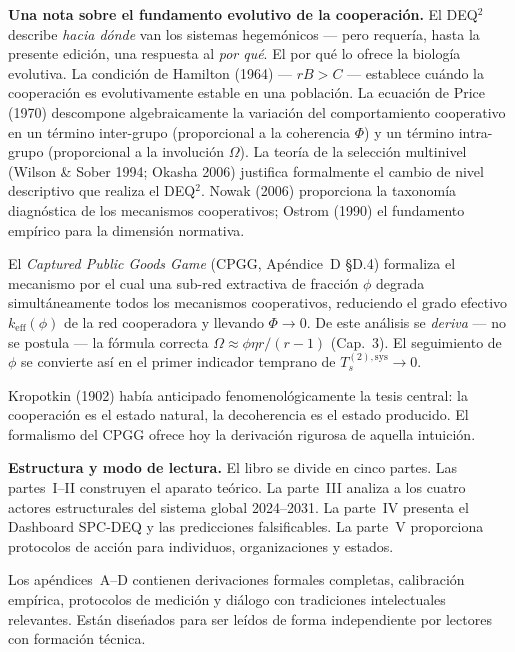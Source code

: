 \documentclass[12pt, twoside]{book}
\theoremstyle{plain}
\theoremstyle{definition}
\theoremstyle{remark}
\begin{document}
\textbf{Una nota sobre el fundamento evolutivo de la cooperaci\'{o}n.}
El DEQ$^2$ describe \textit{hacia d\'{o}nde} van los sistemas hegem\'{o}nicos --- pero requería, hasta la presente edici\'{o}n, una respuesta al \textit{por qu\'{e}}. El por qu\'{e} lo ofrece la biolog\'{i}a evolutiva. La condici\'{o}n de Hamilton (1964) --- $rB > C$ --- establece cu\'{a}ndo la cooperaci\'{o}n es evolutivamente estable en una poblaci\'{o}n. La ecuaci\'{o}n de Price (1970) descompone algebraicamente la variaci\'{o}n del comportamiento cooperativo en un t\'{e}rmino inter-grupo (proporcional a la coherencia $\Phi$) y un t\'{e}rmino intra-grupo (proporcional a la involuci\'{o}n $\Omega$). La teor\'{i}a de la selecci\'{o}n multinivel (Wilson \& Sober 1994; Okasha 2006) justifica formalmente el cambio de nivel descriptivo que realiza el DEQ$^2$. Nowak (2006) proporciona la taxonom\'{i}a diagn\'{o}stica de los mecanismos cooperativos; Ostrom (1990) el fundamento emp\'{i}rico para la dimensi\'{o}n normativa.

El \textit{Captured Public Goods Game} (CPGG, Ap\'{e}ndice~D §D.4) formaliza el mecanismo por el cual una sub-red extractiva de fracci\'{o}n $\phi$ degrada simult\'{a}neamente todos los mecanismos cooperativos, reduciendo el grado efectivo $k_\text{eff}(\phi)$ de la red cooperadora y llevando $\Phi \to 0$. De este an\'{a}lisis se \emph{deriva} --- no se postula --- la f\'{o}rmula correcta $\Omega \approx \phi\eta r/(r-1)$ (Cap.~3). El seguimiento de $\phi$ se convierte as\'{i} en el primer indicador temprano de $T_s^{(2),\text{sys}} \to 0$.

Kropotkin (1902) hab\'{i}a anticipado fenomenol\'{o}gicamente la tesis central: la cooperaci\'{o}n es el estado natural, la decoherencia es el estado producido. El formalismo del CPGG ofrece hoy la derivaci\'{o}n rigurosa de aquella intuici\'{o}n.

\textbf{Estructura y modo de lectura.}
El libro se divide en cinco partes. Las partes~I--II construyen el aparato te\'{o}rico. La parte~III analiza a los cuatro actores estructurales del sistema global 2024--2031. La parte~IV presenta el Dashboard SPC-DEQ y las predicciones falsificables. La parte~V proporciona protocolos de acci\'{o}n para individuos, organizaciones y estados.

Los ap\'{e}ndices~A--D contienen derivaciones formales completas, calibraci\'{o}n emp\'{i}rica, protocolos de medici\'{o}n y di\'{a}logo con tradiciones intelectuales relevantes. Est\'{a}n dise\'{n}ados para ser le\'{i}dos de forma independiente por lectores con formaci\'{o}n t\'{e}cnica.
\end{document}

